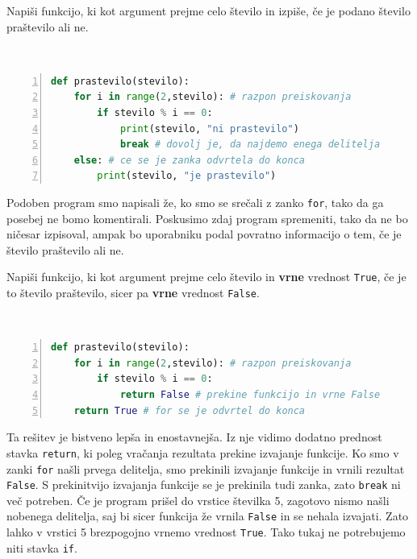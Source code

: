 \begin{zgled}
Napiši funkcijo, ki kot argument prejme celo število in izpiše, če je podano število praštevilo ali ne.
\end{zgled}

\begin{resitev} \  
\begin{lstlisting}[language=Python,numbers=left]
def prastevilo(stevilo):
    for i in range(2,stevilo): # razpon preiskovanja
        if stevilo % i == 0:
            print(stevilo, "ni prastevilo")
            break # dovolj je, da najdemo enega delitelja
    else: # ce se je zanka odvrtela do konca
        print(stevilo, "je prastevilo")   
\end{lstlisting}
\end{resitev}
Podoben program smo napisali že, ko smo se srečali z zanko \texttt{for}, tako da ga posebej ne bomo komentirali. Poskusimo zdaj program spremeniti, tako da ne bo ničesar izpisoval, ampak bo uporabniku podal povratno informacijo o tem, če je število praštevilo ali ne.
\begin{zgled}
Napiši funkcijo, ki kot argument prejme celo število in \textbf{vrne} vrednost \texttt{True}, če je to število praštevilo, sicer pa \textbf{vrne} vrednost \texttt{False}.
\end{zgled}
\begin{resitev} \  
\begin{lstlisting}[language=Python,numbers=left]
def prastevilo(stevilo):
    for i in range(2,stevilo): # razpon preiskovanja
        if stevilo % i == 0:
            return False # prekine funkcijo in vrne False
    return True # for se je odvrtel do konca
\end{lstlisting}
\end{resitev}
Ta rešitev je bistveno lepša in enostavnejša. Iz nje vidimo dodatno prednost stavka \texttt{return}, ki poleg vračanja rezultata prekine izvajanje funkcije. Ko smo v zanki \texttt{for} našli prvega delitelja, smo prekinili izvajanje funkcije in vrnili rezultat \texttt{False}. S prekinitvijo izvajanja funkcije se je prekinila tudi zanka, zato \texttt{break} ni več potreben. Če je program prišel do vrstice številka 5, zagotovo nismo našli nobenega delitelja, saj bi sicer funkcija že vrnila \texttt{False} in se nehala izvajati. Zato lahko v vrstici 5 brezpogojno vrnemo vrednost \texttt{True}. Tako tukaj ne potrebujemo niti stavka \texttt{if}.

